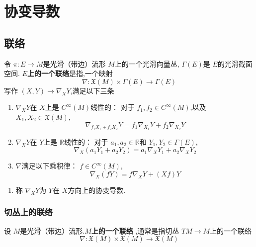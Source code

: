 \documentclass[../../main.tex]{subfiles}
\begin{document}
\chapter{ 协变导数 }

\section{联络}
\begin{definition}
    令 \(  \pi : E\to M  \)是光滑（带边）流形 \(  M  \)上的一个光滑向量丛, \(   \Gamma \left( E \right)   \)是 \(  E  \)的光滑截面空间.
     \textbf{\(  E  \)上的一个联络}是指,一个映射 \[
     \nabla : \mathfrak{X}\left( M \right) \times   \Gamma \left( E \right)\to  \Gamma \left( E \right)   
     \]写作 \(  \left( X,Y \right)\to \nabla _{X}Y   \),满足以下三条 
     \begin{enumerate}
        \item \(  \nabla _{X}Y  \)在 \(  X  \)上是 \(  C^{\infty}\left( M \right)   \)线性的： 对于 \(  f_1,f_2\in C^{\infty}\left( M \right)   \),以及 \(  X_1,X_2 \in \mathfrak{X}\left( M \right)   \), \[
        \nabla _{f_1X_1+ f_2X_2}Y = f_1 \nabla _{X_1}Y+ f_2\nabla _{X_2}Y
        \]
        \item \(  \nabla _{X}Y  \)在 \(  Y  \)上是 \(  \mathbb{R}   \)线性的： 对于 \(  a_1,a_2 \in \mathbb{R}   \)和 \(  Y_1,Y_2 \in  \Gamma \left( E \right)   \), \[
        \nabla _{X}\left( a_1Y_1+ a_2Y_2 \right)=  a_1\nabla _{X}Y_1+ a_2\nabla _{X}Y_2 
        \]
        \item \(  \nabla   \)满足以下乘积律：  \(  f \in C^{\infty}\left( M \right)   \), \[
        \nabla _{X}\left( fY \right)= f\nabla _{X}Y+  \left( Xf \right)Y  
        \]            
     \end{enumerate}
           
\end{definition}
\begin{remark}
    \begin{enumerate}
        \item 称 \(  \nabla _{X}Y  \)为 \(  Y  \)在 \(  X  \)方向上的协变导数.   
    \end{enumerate}
    
\end{remark}
\subsection{切丛上的联络}

\begin{definition}
    设 \(  M  \)是光滑（带边）流形.\textbf{\(  M  \)上的一个联络 },通常是指切丛 \(  TM \to M  \)上的一个联络 \[
     \nabla : \mathfrak{X}\left( M \right)\times \mathfrak{X}\left( M \right)\to \mathfrak{X}\left( M \right)   
    \]  
\end{definition}
\end{document}
